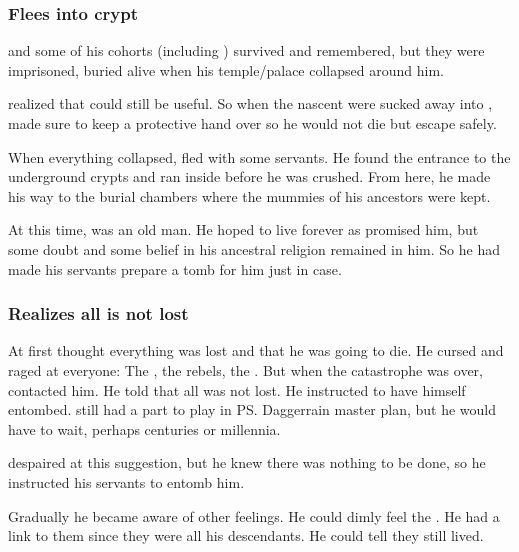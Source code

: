 \subsubsection{Flees into crypt}
\Semiza{} and some of his cohorts (including \Eshayzal) survived and remembered, but they were imprisoned, buried alive when his temple/palace collapsed around him. 

\Daggerrain{} realized that \Semiza{} could still be useful. 
So when the nascent \resphain{} were sucked away into \Nyx{}, \Daggerrain{} made sure to keep a protective hand over \Semiza so he would not die but escape safely. 

When everything collapsed, \Semiza fled with some servants. 
He found the entrance to the underground crypts and ran inside before he was crushed.
From here, he made his way to the burial chambers where the mummies of his ancestors were kept. 

At this time, \Semiza was an old man. 
He hoped to live forever as \Daggerrain promised him, but some doubt and some belief in his ancestral religion remained in him. 
So he had made his servants prepare a tomb for him just in case. 





\subsubsection{Realizes all is not lost}
At first \Semiza{} thought everything was lost and that he was going to die. 
He cursed and raged at everyone: 
The \dragons, the rebels, the \banes. 
But when the catastrophe was over, \Daggerrain contacted him.
He told \Semiza that all was not lost. 
He instructed \Semiza to have himself entombed. 
\Semiza still had a part to play in \ps{Daggerrain} master plan, but he would have to wait, perhaps centuries or millennia. 

\Semiza despaired at this suggestion, but he knew there was nothing to be done, so he instructed his servants to entomb him. 

\begin{prose}
\end{prose}

Gradually he became aware of other feelings. 
He could dimly feel the \resphain. 
He had a link to them since they were all his descendants. 
He could tell they still lived. 





